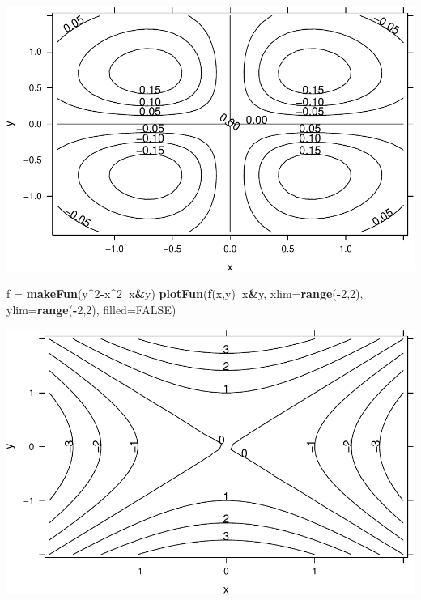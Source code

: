 \documentclass[
]{book}
\newenvironment{Shaded}{\begin{snugshade}}{\end{snugshade}}
\newcommand{\DataTypeTok}[1]{\textcolor[rgb]{0.13,0.29,0.53}{#1}}
\newcommand{\DecValTok}[1]{\textcolor[rgb]{0.00,0.00,0.81}{#1}}
\newcommand{\KeywordTok}[1]{\textcolor[rgb]{0.13,0.29,0.53}{\textbf{#1}}}
\newcommand{\NormalTok}[1]{#1}
\newcommand{\OperatorTok}[1]{\textcolor[rgb]{0.81,0.36,0.00}{\textbf{#1}}}
\newcommand{\OtherTok}[1]{\textcolor[rgb]{0.56,0.35,0.01}{#1}}
\newcommand{\StringTok}[1]{\textcolor[rgb]{0.31,0.60,0.02}{#1}}
\begin{document}
\begin{center}\includegraphics{_bookdown_files/math135_handbook_files/figure-latex/unnamed-chunk-95-1} \end{center}

\begin{Shaded}
\begin{Highlighting}[]
\NormalTok{f =}\StringTok{ }\KeywordTok{makeFun}\NormalTok{(y}\OperatorTok{^}\DecValTok{2}\OperatorTok{-}\NormalTok{x}\OperatorTok{^}\DecValTok{2}\OperatorTok{~}\NormalTok{x}\OperatorTok{&}\NormalTok{y)}
\KeywordTok{plotFun}\NormalTok{(}\KeywordTok{f}\NormalTok{(x,y)}\OperatorTok{~}\NormalTok{x}\OperatorTok{&}\NormalTok{y, }\DataTypeTok{xlim=}\KeywordTok{range}\NormalTok{(}\OperatorTok{-}\DecValTok{2}\NormalTok{,}\DecValTok{2}\NormalTok{), }\DataTypeTok{ylim=}\KeywordTok{range}\NormalTok{(}\OperatorTok{-}\DecValTok{2}\NormalTok{,}\DecValTok{2}\NormalTok{), }\DataTypeTok{filled=}\OtherTok{FALSE}\NormalTok{)}
\end{Highlighting}
\end{Shaded}

\begin{center}\includegraphics{_bookdown_files/math135_handbook_files/figure-latex/unnamed-chunk-96-1} \end{center}
\end{document}
